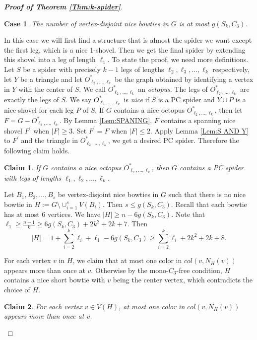 \documentclass[10pt,a4paper]{amsart}
\newtheorem{case}{Case}
\newtheorem{claimA}{Claim}
\begin{document}
\begin{proof}[\textbf{Proof of Theorem \ref{Thm:k-spider}}]
\begin{case}
   The number of vertex-disjoint nice bowties in $G$ is at most $g(S_k,C_3)$.
\end{case}
In this case we will first find a structure that is almost the spider we want except the first leg, which is a nice 1-shovel. Then we get the final spider by extending this shovel into a leg of length $\ell_1$.
To state the proof, we need more definitions.
Let $S$ be a spider with precisely $k-1$ legs of lengths $\ell_2,\ell_3,\ldots,\ell_k$ respectively, let $Y$ be a triangle and let $O^*_{ \ell_2, \ldots, \ell_k}$ be the graph obtained by identifying a vertex in $Y$ with the center of $S$. We call $O^*_{ \ell_2, \ldots, \ell_k}$ an {\it octopus}. The legs of $O^*_{ \ell_2, \ldots, \ell_k}$ are exactly the legs of $S$. We say $O^*_{ \ell_2, \ldots, \ell_k}$ is {\it nice} if $S$ is a PC spider and $Y\cup P$ is a nice shovel for each leg $P$ of $S$. If $G$ contains a {nice} octopus $O^*_{ \ell_2, \ldots, \ell_k}$, then let $F=G-O^*_{ \ell_2, \ldots, \ell_k}$.
By Lemma \ref{Lem:SPANING},  $F$ contains a spanning nice shovel $F^\prime$ when $|F|\geq 3$. Set $F^\prime=F$ when $|F|\leq 2$. Apply Lemma \ref{Lem:S AND Y} to $F^\prime$ and the triangle in $O^*_{ \ell_2, \ldots, \ell_k}$, we get a desired PC spider. Therefore the following claim holds.
\begin{claimA}\label{Cl:octopus}
	If $G$ contains a nice octopus $O^*_{ \ell_2, \ldots, \ell_k}$, then $G$ contains a PC spider with legs of lengths $\ell_1,\ell_2, \ldots, \ell_k$.
\end{claimA}


Let $B_1,B_2,\ldots,B_s$ be vertex-disjoint nice bowties in $G$ such that there is no nice bowtie in $H:=G\setminus \cup_{i=1}^s V(B_i)$. Then $s\leq g(S_k,C_3)$. Recall that each bowtie has at most $6$ vertices. We have $|H|\geq n-6g(S_k,C_3)$. Note that $\ell_1\geq \frac{n-1}{k}\geq 6g(S_k,C_3)+2k^2+2k+7$. Then
$$|H|=1+\sum_{i=2}^k\ell_i+\ell_1-6g(S_k,C_3)\geq \sum_{i=2}^k\ell_i+2k^2+2k+8.$$

For each vertex $v$ in $H$, we claim that at most one color in $col(v,N_{H}(v))$ appears more than once at $v$. Otherwise by the mono-$C_3$-free condition, $H$  contains a nice short bowtie with $v$ being the center vertex, which contradicts the choice of $H$.

\begin{claimA}\label{Cl:color-once}
For each vertex $v\in V(H)$, at most one color in $col(v,N_{H}(v))$ appears more than once at $v$.
\end{claimA}


\end{proof}
\end{document}
